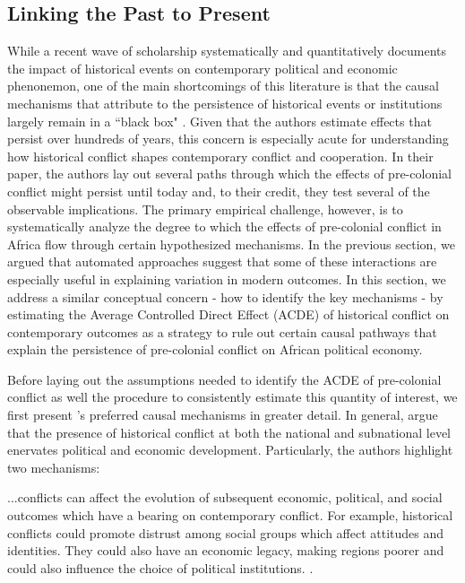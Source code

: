 \subsection{Linking the Past to Present}

While a recent wave of scholarship systematically and quantitatively documents the impact of historical events on contemporary political and economic phenonemon, one of the main shortcomings of this literature is that the causal mechanisms that attribute to the persistence of historical events or institutions largely remain in a ``black box" \citep{ImaiEtAl2011,AcharyaBlackwellSen2016}. Given that the authors estimate effects that persist over hundreds of years, this concern is especially acute for understanding how historical conflict shapes contemporary conflict and cooperation. In their paper, the authors lay out several paths through which the effects of pre-colonial conflict might persist until today and, to their credit, they test several of the observable implications. The primary empirical challenge, however, is to systematically analyze the degree to which the effects of pre-colonial conflict in Africa flow through certain hypothesized mechanisms. In the previous section, we argued that automated approaches suggest that some of these interactions are especially useful in explaining variation in modern outcomes. In this section, we address a similar conceptual concern - how to identify the key mechanisms - by estimating the Average Controlled Direct Effect (ACDE) of historical conflict on contemporary outcomes as a strategy to rule out certain causal pathways that explain the persistence of pre-colonial conflict on African political economy.

Before laying out the assumptions needed to identify the ACDE of pre-colonial conflict as well the procedure to consistently estimate this quantity of interest, we first present \citet{BesleyRQ2014}'s preferred causal mechanisms in greater detail. In general, \citet{BesleyRQ2014} argue that the presence of historical conflict at both the national and subnational level enervates political and economic development. Particularly, the authors highlight two mechanisms:

\begin{displayquote}
...conflicts can affect the evolution of subsequent economic, political, and social outcomes which have a bearing on contemporary conflict. For example, historical conflicts could promote distrust among social groups which affect attitudes and identities. They could also have an economic legacy, making regions poorer and could also influence the choice of political institutions. \citep[pg. 321]{BesleyRQ2014}.
\end{displayquote} 

